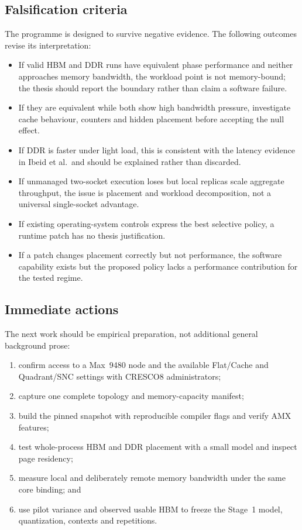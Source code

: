 \subsection{Falsification criteria}

The programme is designed to survive negative evidence.  The following
outcomes revise its interpretation:

\begin{itemize}
  \item If valid HBM and DDR runs have equivalent phase performance and
        neither approaches memory bandwidth, the workload point is not
        memory-bound; the thesis should report the boundary rather than
        claim a software failure.
  \item If they are equivalent while both show high bandwidth pressure,
        investigate cache behaviour, counters and hidden placement
        before accepting the null effect.
  \item If DDR is faster under light load, this is consistent with the
        latency evidence in Ibeid et al.\ and should be explained rather
        than discarded.
  \item If unmanaged two-socket execution loses but local replicas
        scale aggregate throughput, the issue is placement and workload
        decomposition, not a universal single-socket advantage.
  \item If existing operating-system controls express the best selective
        policy, a runtime patch has no thesis justification.
  \item If a patch changes placement correctly but not performance, the
        software capability exists but the proposed policy lacks a
        performance contribution for the tested regime.
\end{itemize}

\subsection{Immediate actions}

The next work should be empirical preparation, not additional general
background prose:

\begin{enumerate}
  \item confirm access to a Max~9480 node and the available Flat/Cache
        and Quadrant/SNC settings with CRESCO8 administrators;
  \item capture one complete topology and memory-capacity manifest;
  \item build the pinned \lcpp{} snapshot with reproducible compiler
        flags and verify AMX features;
  \item test whole-process HBM and DDR placement with a small model and
        inspect page residency;
  \item measure local and deliberately remote memory bandwidth under
        the same core binding; and
  \item use pilot variance and observed usable HBM to freeze the Stage~1
        model, quantization, contexts and repetitions.
\end{enumerate}

